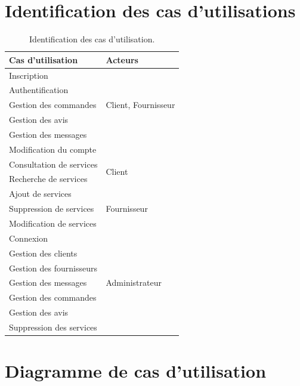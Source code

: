 \documentclass[french]{report}
\begin{document}
\section{Identification des cas d'utilisations}
\begin{table}[H]
    \centering
    \begin{tabular}{|m{5cm}|m{5cm}|}
        \hline
         \textbf{Cas d'utilisation} & \textbf{Acteurs} \\
        \hline
        Inscription & \multirow{5}{5cm}{Client, Fournisseur} \\
        Authentification & \\
        Gestion des commandes & \\
        Gestion des avis & \\
        Gestion des messages & \\
        Modification du compte & \\
        \hline
        Consultation de services & \multirow{2}{5cm}{Client} \\
        Recherche de services & \\
        \hline
        Ajout de services & \multirow{3}{5cm}{Fournisseur} \\
        Suppression de services & \\
        Modification de services & \\
        \hline
        Connexion & \multirow{7}{5cm}{Administrateur} \\
        Gestion des clients & \\
        Gestion des fournisseurs & \\
        Gestion des messages & \\
        Gestion des commandes & \\
        Gestion des avis & \\
        Suppression des services & \\
        \hline
    \end{tabular}
    \caption{Identification des cas d'utilisation.}
    \label{tab:my_label}
\end{table}
\newpage
\section{Diagramme de cas d'utilisation}
\end{document}
